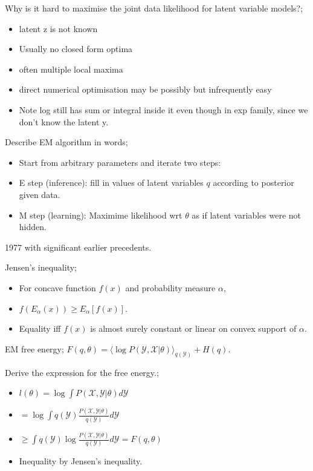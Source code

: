 \documentclass{article}
\begin{document}
Why is it hard to maximise the joint data likelihood for latent variable models?; \begin{itemize}
	\item latent z is not known
	\item Usually no closed form optima
	\item often multiple local maxima
	\item direct numerical optimisation may be possibly but infrequently easy
	\item Note log still has sum or integral inside it even though in exp family, since we don't know the latent y.
\end{itemize}

Describe EM algorithm in words; \begin{itemize}
	\item Start from arbitrary parameters and iterate two steps:
	\item E step (inference): fill in values of latent variables $q$ according to posterior given data.
	\item M step (learning): Maximime likelihood wrt $\theta$ as if latent variables were not hidden.
\end{itemize} 1977 with significant earlier precedents.

Jensen's inequality; \begin{itemize}
	\item For concave function $f(x)$ and probability measure $\alpha$,
	\item $f(E_{\alpha}(x))\geq E_\alpha[f(x)]$.
	\item Equality iff $f(x)$ is almost surely constant or linear on convex support of $\alpha$.
\end{itemize}

EM free energy; $F(q,\theta) = \langle \log P(\mathcal{Y, X}|\theta)\rangle_{q(\mathcal{Y})}+H(q)$.

Derive the expression for the free energy.; \begin{itemize}
	\item $l(\theta) = \log \int P(\mathcal{X, Y}|\theta)d\mathcal{Y}$ \item $= \log \int q(\mathcal{Y})\frac{P(\mathcal{X, Y}|\theta)}{q(\mathcal{Y})}d\mathcal{Y}$ \item $\geq \int q(\mathcal{Y})\log \frac{P(\mathcal{X, Y}|\theta)}{q(\mathcal{Y})}d\mathcal{Y} = F(q,\theta)$ \item Inequality by Jensen's inequality.
\end{itemize}
\end{document}

